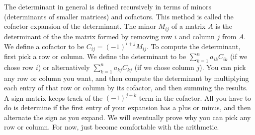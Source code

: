 The determinant in general is defined recursively in terms of minors (determinants of smaller matrices) and cofactors. 
This method is called the cofactor expansion of the determinant. 
The minor {$M_{ij}$} of a matrix {$A$} is the determinant of the the matrix formed by removing row {$i$} and column {$j$} from {$A$}.  
We define a cofactor to be {$C_{ij} = (-1)^{i+j}M_{ij}$}.  
To compute the determinant, first pick a row or column.
We define the determinant to be $\sum_{k=1}^n a_{ik}C_{ik}$ (if we chose row $i$) or alternatively $\sum_{k=1}^n a_{kj}C_{kj}$ (if we chose column $j$). 
You can pick any row or column you want, and then compute the determinant by multiplying each entry of that row or column by its cofactor, and then summing the results.  
A sign matrix keeps track of the $(-1)^{j+k}$ term in the cofactor. All you have to do is determine if the first entry of your expansion has a plus or minus, and then alternate the sign as you expand. We will eventually prove why you can pick any row or column. For now, just become comfortable with the arithmetic.
